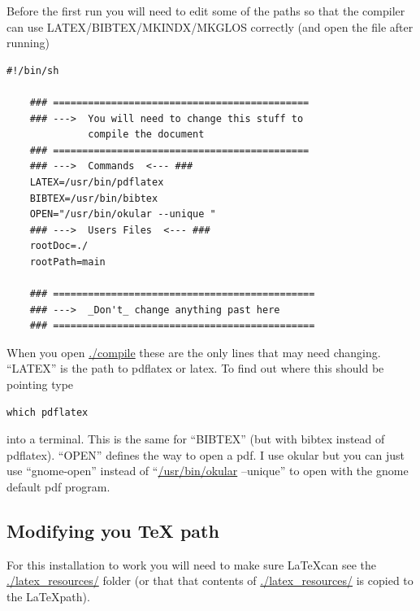     Before the first run you will need to edit some of the paths so that the compiler can use LATEX/BIBTEX/MKINDX/MKGLOS correctly (and open the file after running)

    \begin{lstlisting}[style=base]
    #!/bin/sh

    ### ============================================
    ### --->  You will need to change this stuff to 
              compile the document
    ### ============================================
    ### --->  Commands  <--- ###
    LATEX=/usr/bin/pdflatex
    BIBTEX=/usr/bin/bibtex
    OPEN="/usr/bin/okular --unique "
    ### --->  Users Files  <--- ###
    rootDoc=./
    rootPath=main

    ### =============================================
    ### --->  _Don't_ change anything past here  
    ### =============================================
    \end{lstlisting}

    \noindent When you open \url{./compile} these are the only lines that may need changing. ``LATEX'' is the path to pdflatex or latex. To find out where this should be pointing type

    \begin{lstlisting}[style=base]
    which pdflatex
    \end{lstlisting}

    \noindent into a terminal. This is the same for ``BIBTEX'' (but with bibtex instead of pdflatex). ``OPEN'' defines the way to open a pdf. I use okular but you can just use ``gnome-open'' instead of ``\url{/usr/bin/okular} --unique'' to open with the gnome default pdf program.

    \vspace{1cm}

\subsection{Modifying you TeX path}
	\label{ch1_section_installation_modifying_tex_path}

    For this installation to work you will need to make sure \LaTeX can see the \url{./latex_resources/} folder (or that that contents of \url{./latex_resources/} is copied to the \LaTeX path). \\

